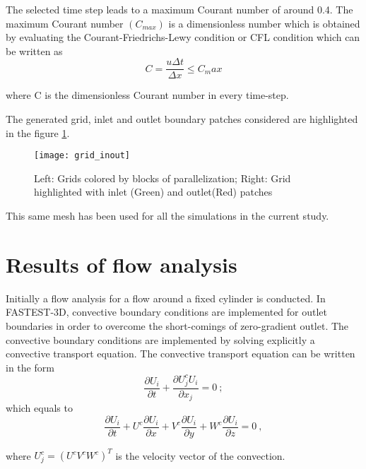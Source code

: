 The selected time step leads to a maximum Courant number of around 0.4. The maximum Courant number $(C_{max})$ is a dimensionless number which is obtained
by evaluating the Courant-Friedrichs-Lewy condition or CFL condition which can be written as   
\begin{equation}
C = \frac{u \Delta t}{\Delta x} \leq C_max
\label{eqn:4.1} 
\end{equation}

where C is the dimensionless Courant number in every time-step.

The generated grid, inlet and outlet boundary patches considered are highlighted in the figure \ref{fig:4.1}.
\begin{figure}[h]
	\begin{minipage}[t]{4cm}
	\end{minipage}
	\hspace{4cm}
	\begin{minipage}[t]{4cm}
		\texttt{[image: grid\_inout]}
	\end{minipage}
\caption{Left: Grids colored by blocks of parallelization; Right: Grid highlighted with inlet (Green) and outlet(Red) patches}
\label{fig:4.1}
\end{figure}

This same mesh has been used for all the simulations in the current study.

\section{Results of flow analysis}
Initially a flow analysis for a flow around a fixed cylinder is conducted. In FASTEST-3D, convective boundary conditions are implemented for outlet boundaries in order to overcome the short-comings of zero-gradient outlet. The convective boundary conditions are implemented by solving explicitly a convective transport equation. The convective transport equation can be written in the form
\[ \frac {\partial U_i}{\partial t} + \frac{\partial U^c_j
  U_i}{\partial x_j} = 0 ~; 
\]
which equals to 
\[ \frac {\partial U_i}{\partial t} + U^c \frac{\partial U_i}{\partial
  x} + V^c \frac{\partial U_i}{\partial y} + W^c \frac{\partial
  U_i}{\partial z}   = 0 ~,
\]

where $ U^c_j = ( U^c V^c W^c )^T $ is the velocity vector of the
convection.\\


